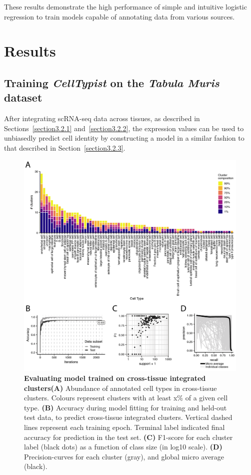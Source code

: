 These results demonstrate the high performance of simple and intuitive logistic regression to train models capable of annotating data from various sources.



\section{Results}
\label{section3.3}
\subsection{Training \textit{CellTypist} on the \textit{Tabula Muris} dataset}
\label{section3.3_mouse}
After integrating scRNA-seq data across tissues, as described in Sections~\ref{section3.2.1} and~\ref{section3.2.2}, the expression values can be used to unbiasedly predict cell identity by constructing a model in a similar fashion to that described in Section~\ref{section3.2.3}.

\begin{figure}[ht!]
    \centering    
    \includegraphics[scale=0.73]{Chapter3/Figs/chap3_modelcl.png} %
    \caption[Evaluating model trained on cross-tissue integrated clusters]{\textbf{Evaluating model trained on cross-tissue integrated clusters}\newline\textbf{(A)} Abundance of annotated cell types in cross-tissue clusters. Colours represent clusters with at least x\% of a given cell type. \textbf{(B)} Accuracy during model fitting for training and held-out test data, to predict cross-tissue integrated clusters. Vertical dashed lines represent each training epoch. Terminal label indicated final accuracy for prediction in the test set. \textbf{(C)} F1-score for each cluster label (black dots) as a function of class size (in log10 scale). \textbf{(D)} Precision-curves for each cluster (gray), and global micro average (black).}
    \label{fig:chap3_modelcl}
\end{figure}

